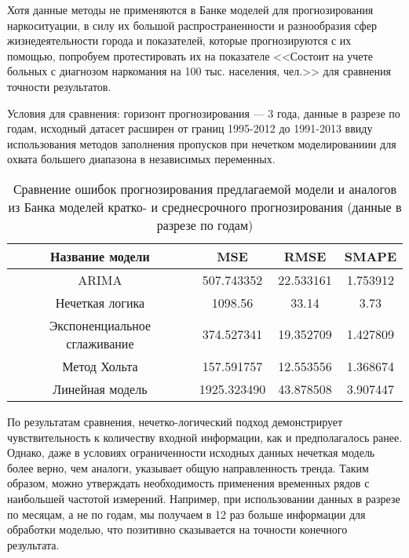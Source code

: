 Хотя данные методы не применяются в Банке моделей для прогнозирования
наркоситуации, в силу их большой распространенности и разнообразия сфер
жизнедеятельности города и показателей, которые прогнозируются с их помощью,
попробуем протестировать их на показателе <<Состоит на учете больных с диагнозом
наркомания на 100 тыс. населения, чел.>> для сравнения точности результатов.

Условия для сравнения: горизонт прогнозирования --- 3 года, данные в разрезе по
годам, исходный датасет расширен от границ 1995-2012 до 1991-2013 ввиду
использования методов заполнения пропусков при нечетком моделированиии для
охвата большего диапазона в независимых переменных.

\begin{table}[bhtp]
    \centering
    \caption{Сравнение ошибок прогнозирования предлагаемой модели и аналогов из
        Банка моделей кратко- и среднесрочного прогнозирования (данные в разрезе
        по годам)}
        \begin{tabular}{ | c | c | c | c | }
            \hline
            Название модели & MSE & RMSE & SMAPE \\
            \hline
            ARIMA & 507.743352 & 22.533161 & 1.753912\\
            \hline
            Нечеткая логика & 1098.56 & 33.14 & 3.73 \\
            \hline
            Экспоненциальное сглаживание & 374.527341 & 19.352709 & 1.427809\\
            \hline
            Метод Хольта & 157.591757 & 12.553556 & 1.368674\\
            \hline
            Линейная модель & 1925.323490 & 43.878508 & 3.907447\\
            \hline
        \end{tabular}
    \label{table:short_model_comparison}
\end{table}

По результатам сравнения, нечетко-логический подход демонстрирует
чувствительность к количеству входной информации, как и предполагалось ранее.
Однако, даже в условиях ограниченности исходных данных нечеткая модель более
верно, чем аналоги, указывает общую направленность тренда. Таким образом, можно
утверждать необходимость применения временных рядов с наибольшей частотой
измерений. Например, при использовании данных в разрезе по месяцам, а не по
годам, мы получаем в 12 раз больше информации для обработки моделью, что
позитивно сказывается на точности конечного результата.


